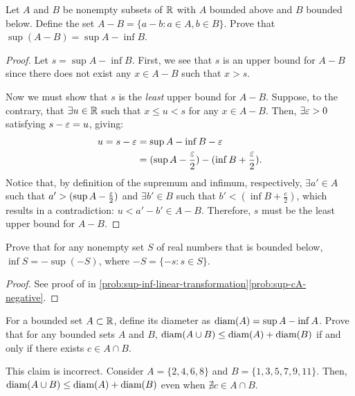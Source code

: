 \begin{problem}
  Let $A$ and $B$ be nonempty subsets of $\mathbb{R}$ with $A$ bounded above and $B$
  bounded below. Define the set $A - B = \{ a - b : a \in A, b \in B\}$.
  Prove that $\sup(A-B) = \sup A - \inf B$.
\end{problem}

\begin{proof}
  Let $s = \sup A - \inf B$. First, we see that $s$ is an upper bound
  for $A - B$ since there does not exist any $x \in A - B$ such that $x > s$.

  Now we must show that $s$ is the \textit{least} upper bound for $A - B$. Suppose,
  to the contrary, that $\exists u \in \mathbb{R}$ such that $x \leq u < s$ for any $x \in A - B$.
  Then, $\exists \varepsilon > 0$ satisfying $s - \varepsilon = u$, giving:
  \begin{align*}
    u = s - \varepsilon &= \sup A - \inf B - \varepsilon \\
                 &= (\sup A - \frac{\varepsilon}{2}) - (\inf B + \frac{\varepsilon}{2}). \\ 
  \end{align*}
  Notice that, by definition of the supremum and infimum, respectively,
  $\exists a' \in A$ such that $a' > (\sup A - \frac{\varepsilon}{2})$ and $\exists b'
  \in B$ such that $b' < (\inf B + \frac{e}{2})$, which results in a
  contradiction: $u < a' - b' \in A - B$. Therefore, $s$ must be the least
  upper bound for $A - B$.
\end{proof}

\begin{problem}
  Prove that for any nonempty set $S$ of real numbers that is bounded below,
  $\inf S = - \sup(-S)$, where $-S = \{ -s : s \in S\}$.
\end{problem}

\begin{proof}
  See proof of  in \ref{prob:sup-inf-linear-transformation}\ref{prob:sup-cA-negative}.
\end{proof}

\begin{problem}
  For a bounded set $A \subset \mathbb{R}$, define its diameter as $\text{diam}(A) = \sup A -
  \inf A$. Prove that for any bounded sets $A$ and $B$, $\text{diam}(A \cup B) \leq
  \text{diam}(A) + \text{diam}(B)$ if and only if there exists $c \in A \cap B$.
\end{problem}

\begin{callout}
  This claim is incorrect. Consider $A = \{2, 4, 6, 8\}$ and $B = \{1, 3, 5, 7, 9, 11 \}$.
  Then, $\text{diam}(A \cup B) \leq \text{diam}(A) + \text{diam}(B)$ even when $\nexists c \in A \cap B$. 
\end{callout}

